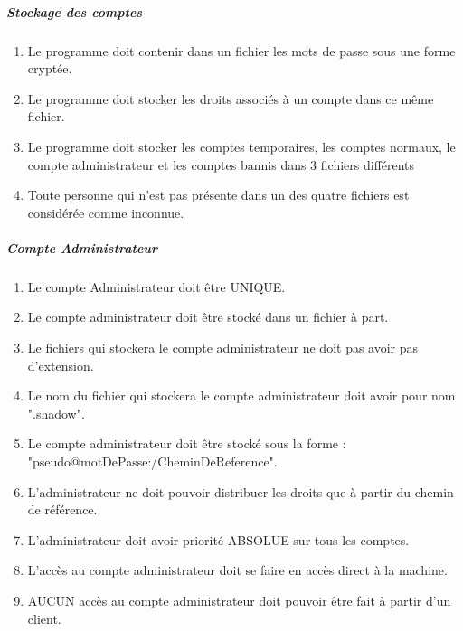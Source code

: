 \documentclass[10pt,a4paper]{report}
\begin{document}
	\subparagraph{Stockage des comptes}
		\begin{enumerate}
			\item Le programme doit contenir dans un fichier les mots de passe sous une forme cryptée.
			\item Le programme doit stocker les droits associés à un compte dans ce même fichier.
			\item Le programme doit stocker les comptes temporaires, les comptes normaux, le compte administrateur et les comptes bannis dans 3 fichiers différents
			\item Toute personne qui n'est pas présente dans un des quatre fichiers est considérée comme inconnue.
		\end{enumerate}

		
	\subparagraph{Compte Administrateur}
		\begin{enumerate}
			\item Le compte Administrateur doit être UNIQUE.
			\item Le compte administrateur doit être stocké dans un fichier à part.
			\item Le fichiers qui stockera le compte administrateur ne doit pas avoir pas d'extension.
			\item Le nom du fichier qui stockera le compte administrateur doit avoir pour nom ".shadow".
			\item Le compte administrateur doit être stocké sous la forme : "pseudo@motDePasse:/CheminDeReference".
			\item L'administrateur ne doit pouvoir distribuer les droits que à partir du chemin de référence.
			\item L'administrateur doit avoir priorité ABSOLUE sur tous les comptes.
			\item L'accès au compte administrateur doit se faire en accès direct à la machine. 
			\item AUCUN accès au compte administrateur doit pouvoir être fait à partir d'un client.
		\end{enumerate}
		
\end{document}
